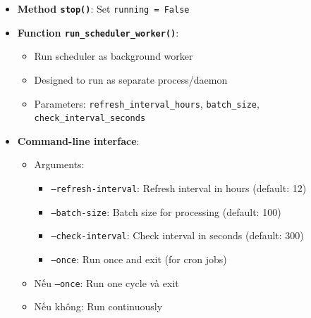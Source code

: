 \begin{itemize}
    \item \textbf{Method \texttt{stop()}}: Set \texttt{running = False}
    
    \item \textbf{Function \texttt{run\_scheduler\_worker()}}:
    \begin{itemize}
        \item Run scheduler as background worker
        \item Designed to run as separate process/daemon
        \item Parameters: \texttt{refresh\_interval\_hours}, \texttt{batch\_size}, \texttt{check\_interval\_seconds}
    \end{itemize}
    
    \item \textbf{Command-line interface}:
    \begin{itemize}
        \item Arguments:
        \begin{itemize}
            \item \texttt{--refresh-interval}: Refresh interval in hours (default: 12)
            \item \texttt{--batch-size}: Batch size for processing (default: 100)
            \item \texttt{--check-interval}: Check interval in seconds (default: 300)
            \item \texttt{--once}: Run once and exit (for cron jobs)
        \end{itemize}
        \item Nếu \texttt{--once}: Run one cycle và exit
        \item Nếu không: Run continuously
    \end{itemize}
\end{itemize}


